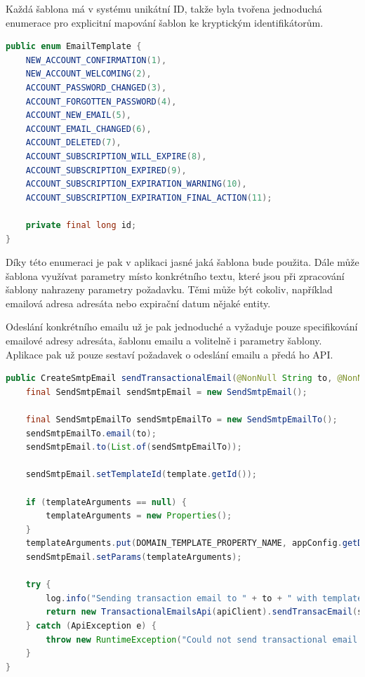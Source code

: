 		Každá šablona má v systému unikátní ID, takže byla tvořena jednoduchá enumerace pro explicitní mapování
		šablon ke kryptickým identifikátorům.

		\begin{lstlisting}[language=Java]
public enum EmailTemplate {
    NEW_ACCOUNT_CONFIRMATION(1),
    NEW_ACCOUNT_WELCOMING(2),
    ACCOUNT_PASSWORD_CHANGED(3),
    ACCOUNT_FORGOTTEN_PASSWORD(4),
    ACCOUNT_NEW_EMAIL(5),
    ACCOUNT_EMAIL_CHANGED(6),
    ACCOUNT_DELETED(7),
    ACCOUNT_SUBSCRIPTION_WILL_EXPIRE(8),
    ACCOUNT_SUBSCRIPTION_EXPIRED(9),
    ACCOUNT_SUBSCRIPTION_EXPIRATION_WARNING(10),
    ACCOUNT_SUBSCRIPTION_EXPIRATION_FINAL_ACTION(11);

    private final long id;
}
		\end{lstlisting}

		Díky této enumeraci je pak v aplikaci jasné jaká šablona bude použita.
		Dále může šablona využívat parametry místo konkrétního textu, které jsou při zpracování šablony nahrazeny
		parametry požadavku.
		Těmi může být cokoliv, například emailová adresa adresáta nebo expirační datum nějaké entity.

		Odeslání konkrétního emailu už je pak jednoduché a vyžaduje pouze specifikování emailové adresy adresáta,
		šablonu emailu a volitelně i parametry šablony.
		Aplikace pak už pouze sestaví požadavek o odeslání emailu a předá ho \ac{API}.

		\begin{lstlisting}[language=Java]
public CreateSmtpEmail sendTransactionalEmail(@NonNull String to, @NonNull EmailTemplate template, Properties templateArguments) {
	final SendSmtpEmail sendSmtpEmail = new SendSmtpEmail();

	final SendSmtpEmailTo sendSmtpEmailTo = new SendSmtpEmailTo();
	sendSmtpEmailTo.email(to);
	sendSmtpEmail.to(List.of(sendSmtpEmailTo));

	sendSmtpEmail.setTemplateId(template.getId());

	if (templateArguments == null) {
		templateArguments = new Properties();
	}
	templateArguments.put(DOMAIN_TEMPLATE_PROPERTY_NAME, appConfig.getDomain());
	sendSmtpEmail.setParams(templateArguments);

	try {
		log.info("Sending transaction email to " + to + " with template " + template + " ...");
		return new TransactionalEmailsApi(apiClient).sendTransacEmail(sendSmtpEmail);
	} catch (ApiException e) {
		throw new RuntimeException("Could not send transactional email to " + to + " with template " + template + ": ", e);
	}
}
		\end{lstlisting}

